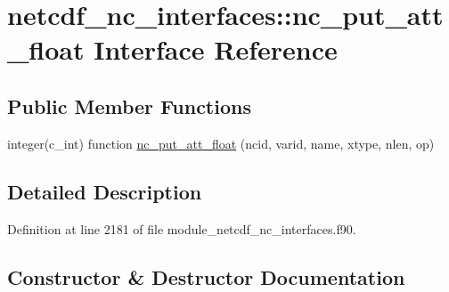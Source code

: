 \hypertarget{interfacenetcdf__nc__interfaces_1_1nc__put__att__float}{}\section{netcdf\+\_\+nc\+\_\+interfaces\+:\+:nc\+\_\+put\+\_\+att\+\_\+float Interface Reference}
\label{interfacenetcdf__nc__interfaces_1_1nc__put__att__float}
\subsection*{Public Member Functions}
\begin{DoxyCompactItemize}
\item 
integer(c\+\_\+int) function \hyperlink{interfacenetcdf__nc__interfaces_1_1nc__put__att__float_aa8ea9148bc46ab3da86f85f5437c8676}{nc\+\_\+put\+\_\+att\+\_\+float} (ncid, varid, name, xtype, nlen, op)
\end{DoxyCompactItemize}


\subsection{Detailed Description}


Definition at line 2181 of file module\+\_\+netcdf\+\_\+nc\+\_\+interfaces.\+f90.



\subsection{Constructor \& Destructor Documentation}
\mbox{\label{interfacenetcdf__nc__interfaces_1_1nc__put__att__float_aa8ea9148bc46ab3da86f85f5437c8676}} 
